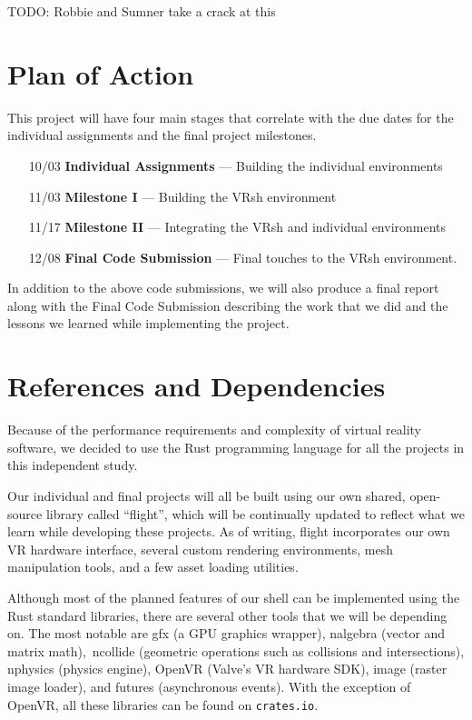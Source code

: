 \documentclass[titlepage,12pt]{article}
\begin{document}
TODO: Robbie and Sumner take a crack at this

\section{Plan of Action}

This project will have four main stages that correlate with the due dates for
the individual assignments and the final project milestones.

\begin{enumerate}[leftmargin=*]
    \item [10/03] \textbf{Individual Assignments} --- Building the individual
        environments
    \item [11/03] \textbf{Milestone I} --- Building the VRsh environment
    \item [11/17] \textbf{Milestone II} --- Integrating the VRsh and individual
        environments
    \item [12/08] \textbf{Final Code Submission} --- Final touches to the VRsh
        environment.
\end{enumerate}

In addition to the above code submissions, we will also produce a final report
along with the Final Code Submission describing the work that we did and the
lessons we learned while implementing the project.

\section{References and Dependencies}

Because of the performance requirements and complexity of virtual reality software,
we decided to use the Rust programming language for all the projects in this 
independent study.

Our individual and final projects will all be built using our own shared, open-source
library called ``flight'', which will be continually updated to reflect what we learn 
while developing these projects. As of writing, flight incorporates our own VR hardware
interface, several custom rendering environments, mesh manipulation tools, and a few 
asset loading utilities.

Although most of the planned features of our shell can be implemented using the 
Rust standard libraries, there are several other tools that we will be depending on. 
The most notable are gfx (a GPU graphics wrapper), nalgebra (vector and matrix math),\
ncollide (geometric operations such as collisions and intersections), nphysics (physics
engine), OpenVR (Valve's VR hardware SDK), image (raster image loader), and futures
(asynchronous events). With the exception of OpenVR, all these libraries can be found on 
\texttt{crates.io}.
\end{document}
